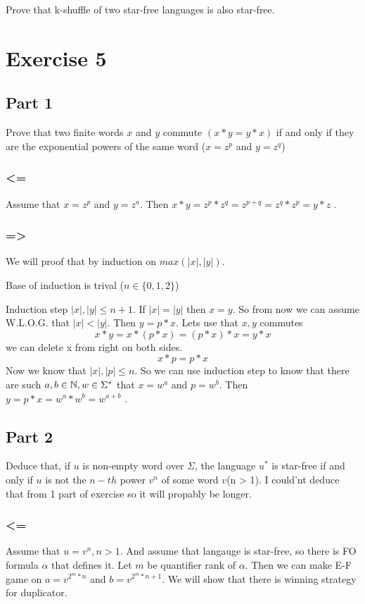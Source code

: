 \documentclass{article}
\begin{document}
Prove that k-shuffle of two star-free languages is also star-free.

\section{Exercise 5}

\subsection{Part 1}
Prove that two finite words $x$ and $y$ commute $(x*y = y * x)$ if and only if they are
the exponential powers of the same word ($x = z^p$ and $y=z^q$)

\subsubsection{<=}
Assume that $x = z^p$ and $y = z^a$. Then $x*y = z^p * z^q = z^{p+q} = z^q * z^p = y*z$ \coffee. 

\subsubsection{=>}
We will proof that by induction on $max(|x|, |y|)$.

Base of induction is trival ($n \in \{0,1,2\}$)


Induction step $|x|, |y| \leq n+1$. If $|x| = |y|$ then $x = y$. So from now we can assume W.L.O.G.
that $|x| < |y|$. Then $y = p * x$. Lets use that $x,y$ commutes
\[ x * y = x * (p * x) = (p * x) * x = y * x\]
we can delete x from right on both sides.
\[ x * p = p * x\]
Now we know that $|x|, |p| \leq n$. So we can use induction step to know that there are such $a,b \in \mathbb{N} ,w \in \Sigma^*$ that $x =w^a$ and $p = w^b$. Then $y = p * x = w^a * w^b = w^{a+b}$ \coffee. 

\subsection{Part 2}
Deduce that, if $u$ is non-empty word over $\Sigma$, the language $u^*$ is star-free if and only if $u$ is not the $n-th$ power $v^n$ of some word $v$(n > 1). I could'nt deduce that from 1 part of exercise so it will propably be longer.

\subsubsection{<=}
Assume that $u = v^n, n > 1$. And assume that langauge is star-free, so there is FO formula $\alpha$ that defines it. Let $m$ be quantifier rank of $\alpha$. Then we can make E-F game on $a = v^{2^m * n}$ and $b = v^{2^m * n + 1}$. We will show that there is winning strategy for duplicator.
\end{document}

